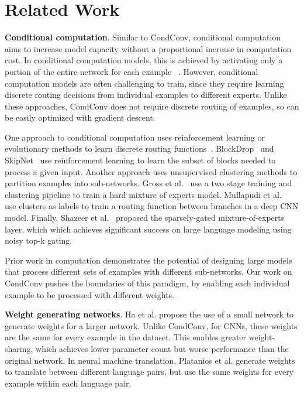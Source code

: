 \documentclass{article}
\def\codename{CondConv}
\begin{document}
\section{Related Work}


\textbf{Conditional computation}. 
Similar to \codename{}, conditional computation aims to increase model capacity without a proportional increase in computation cost. In conditional computation models, this is achieved by activating only a portion of the entire network for each example ~\cite{bengio2013estimating, davis2013low, cho2014exponentially, bengio2015conditional}. However, conditional computation models are often challenging to train, since they require learning discrete routing decisions from individual examples to different experts. Unlike these approaches, \codename{} does not require discrete routing of examples, so can be easily optimized with gradient descent.

One approach to conditional computation uses reinforcement learning or evolutionary methods to learn discrete routing functions~\cite{rosenbaum2017routing, mcgill2017deciding, liu2018dynamic, fernando2017pathnet}. BlockDrop~\cite{wu2018blockdrop} and SkipNet~\cite{wang2018skipnet} use reinforcement learning to learn the subset of blocks needed to process a given input. Another approach uses unsupervised clustering methods to partition examples into sub-networks. Gross et al.~\cite{gross2017hard} use a two stage training and clustering pipeline to train a hard mixture of experts model. Mullapudi et al.~\cite{ravi18} use clusters as labels to train a routing function between branches in a deep CNN model. Finally, Shazeer et al.~\cite{shazeer2017outrageously} proposed the sparsely-gated mixture-of-experts layer, which which achieves significant success on large language modeling using noisy top-k gating.
 
Prior work in computation demonstrates the potential of designing large models that process different sets of examples with different sub-networks. Our work on \codename{} pushes the boundaries of this paradigm, by enabling each individual example to be processed with different weights.

\textbf{Weight generating networks}. Ha et al. \cite{ha2016hypernetworks} propose the use of a small network to generate weights for a larger network. Unlike \codename{}, for CNNs, these weights are the same for every example in the dataset. This enables greater weight-sharing, which achieves lower parameter count but worse performance than the original network. In neural machine translation, Platanios et al. \cite{platanios2018contextual} generate weights to translate between different language pairs, but use the same weights for every example within each language pair. 
\end{document}
